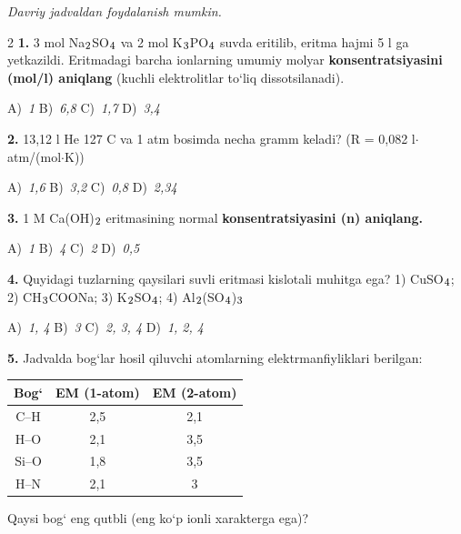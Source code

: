 \documentclass[11pt,a4paper]{article}
\renewcommand{\normalsize}{\fontsize{10.9}{13.4}\selectfont}
\renewcommand{\textsubscript}[1]{\ensuremath{_{\text{\fontsize{8}{8}\selectfont #1}}}}
\begin{document}
\normalsize
\thispagestyle{first}
\noindent{}
\par\medskip
\noindent\textit{Davriy jadvaldan foydalanish mumkin.}
\par\medskip
\begin{multicols}{2}
\noindent\textbf{1.} 3 mol Na\textsubscript{2}SO\textsubscript{4} va 2 mol K\textsubscript{3}PO\textsubscript{4} suvda eritilib, eritma hajmi 5 l ga yetkazildi. Eritmadagi barcha ionlarning umumiy molyar \textbf{konsentratsiyasini (mol/l) aniqlang} (kuchli elektrolitlar to`liq dissotsilanadi).

\noindent A)~\textsl{1} \hfill B)~\textsl{6,8} \hfill C)~\textsl{1,7} \hfill D)~\textsl{3,4}\par
\vspace{4pt}
\noindent\textbf{2.} 13,12 l He 127 \textdegree{}C va 1 atm bosimda necha gramm keladi? (R = 0,082 l$\cdot$atm/(mol$\cdot$K))

\noindent A)~\textsl{1,6} \hfill B)~\textsl{3,2} \hfill C)~\textsl{0,8} \hfill D)~\textsl{2,34}\par
\vspace{4pt}
\noindent\textbf{3.} 1 M Ca(OH)\textsubscript{2} eritmasining normal \textbf{konsentratsiyasini (n) aniqlang.}

\noindent A)~\textsl{1} \hfill B)~\textsl{4} \hfill C)~\textsl{2} \hfill D)~\textsl{0,5}\par
\vspace{4pt}
\noindent\textbf{4.} Quyidagi tuzlarning qaysilari suvli eritmasi kislotali muhitga ega? 1) CuSO\textsubscript{4}; 2) CH\textsubscript{3}COONa; 3) K\textsubscript{2}SO\textsubscript{4}; 4) Al\textsubscript{2}(SO\textsubscript{4})\textsubscript{3}

\noindent A)~\textsl{1, 4} \hfill B)~\textsl{3} \hfill C)~\textsl{2, 3, 4} \hfill D)~\textsl{1, 2, 4}\par
\vspace{4pt}
\noindent\textbf{5.} Jadvalda bog`lar hosil qiluvchi atomlarning elektrmanfiyliklari berilgan:
\begin{center}
\renewcommand{\arraystretch}{1.15}
\begin{tabular}{|c|c|c|}\hline
\textbf{Bog`} & \textbf{EM (1-atom)} & \textbf{EM (2-atom)} \\ \hline
C--H & 2,5 & 2,1 \\ \hline
H--O & 2,1 & 3,5 \\ \hline
Si--O & 1,8 & 3,5 \\ \hline
H--N & 2,1 & 3 \\ \hline
\end{tabular}
\end{center}
Qaysi bog` eng qutbli (eng ko`p ionli xarakterga ega)?


\end{multicols}
\end{document}
